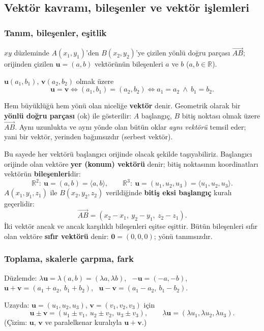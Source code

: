 \subsection{Vektör kavramı, bileşenler ve vektör işlemleri}

\subsubsection{Tanım, bileşenler, eşitlik}

\begin{tahta}
$xy$ düzleminde $A(x_1,y_1)$'den $B(x_2,y_2)$'ye çizilen yönlü doğru parçası $\overrightarrow{AB}$; orijinden çizilen $\mathbf u=(a,b)$ vektörünün bileşenleri $a$ ve $b$ ($a,b\in\mathbb R$).

$\mathbf u(a_1,b_1)$, $\mathbf v(a_2,b_2)$ olmak üzere
\[
\mathbf u=\mathbf v\iff(a_1,b_1)=(a_2,b_2)\iff a_1=a_2\ \wedge\ b_1=b_2 .
\]
\end{tahta}

\begin{tanim}[Vektör]
Hem büyüklüğü hem yönü olan niceliğe \textbf{vektör} denir. Geometrik olarak bir \textbf{yönlü doğru parçası} (ok) ile gösterilir: $A$ başlangıç, $B$ bitiş noktası olmak üzere $\overrightarrow{AB}$. Aynı uzunlukta ve aynı yönde olan bütün oklar \emph{aynı vektörü} temsil eder; yani bir vektör, yerinden bağımsızdır (serbest vektör).
\end{tanim}

Bu sayede her vektörü başlangıcı orijinde olacak şekilde taşıyabiliriz. Başlangıcı orijinde olan vektöre \textbf{yer (konum) vektörü} denir; bitiş noktasının koordinatları vektörün \textbf{bileşenleri}dir:
\[
\mathbb R^2:\ \mathbf u=(a,b)=\langle a,b\rangle,\qquad \mathbb R^3:\ \mathbf u=(u_1,u_2,u_3)=\langle u_1,u_2,u_3\rangle .
\]
$A(x_1,y_1,z_1)$ ile $B(x_2,y_2,z_2)$ verildiğinde \textbf{bitiş eksi başlangıç} kuralı geçerlidir:
\[
\overrightarrow{AB}=(x_2-x_1,\ y_2-y_1,\ z_2-z_1).
\]
İki vektör ancak ve ancak karşılıklı bileşenleri eşitse eşittir. Bütün bileşenleri sıfır olan vektöre \textbf{sıfır vektörü} denir: $\mathbf 0=(0,0,0)$; yönü tanımsızdır.

\subsubsection{Toplama, skalerle çarpma, fark}

\begin{tahta}
Düzlemde: $\lambda\mathbf u=\lambda(a,b)=(\lambda a,\lambda b)$, \ $-\mathbf u=(-a,-b)$, \
$\mathbf u+\mathbf v=(a_1+a_2,\ b_1+b_2)$, \ $\mathbf u-\mathbf v=(a_1-a_2,\ b_1-b_2)$.

Uzayda: $\mathbf u=(u_1,u_2,u_3)$, $\mathbf v=(v_1,v_2,v_3)$ için
\[
\mathbf u\pm\mathbf v=(u_1\pm v_1,\ u_2\pm v_2,\ u_3\pm v_3),\qquad \lambda\mathbf u=(\lambda u_1,\lambda u_2,\lambda u_3).
\]
(Çizim: $\mathbf u$, $\mathbf v$ ve paralelkenar kuralıyla $\mathbf u+\mathbf v$.)
\end{tahta}

